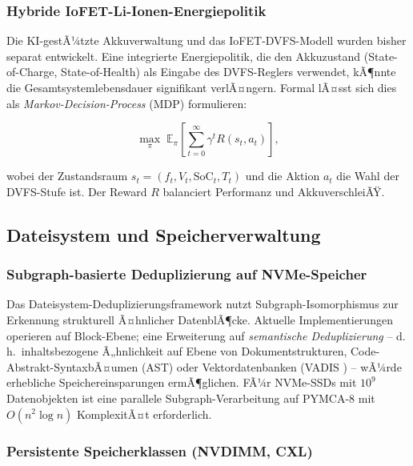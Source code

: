 ﻿\documentclass[a4paper,12pt]{scrreprt}
\theoremstyle{definition}
\begin{document}
	\subsubsection{Hybride IoFET-Li-Ionen-Energiepolitik}
	
	Die KI-gestÃ¼tzte Akkuverwaltung \cite{Epp2026liionp} und das
	IoFET-DVFS-Modell \cite{Epp2026iono} wurden bisher separat entwickelt.
	Eine integrierte Energiepolitik, die den Akkuzustand (State-of-Charge,
	State-of-Health) als Eingabe des DVFS-Reglers verwendet, kÃ¶nnte
	die Gesamtsystemlebensdauer signifikant verlÃ¤ngern. Formal lÃ¤sst sich
	dies als \emph{Markov-Decision-Process} (MDP) formulieren:
	
	\[
	\max_\pi\; \mathbb{E}_\pi\!\left[\sum_{t=0}^{\infty}
	\gamma^t R(s_t, a_t)\right],
	\]
	
	wobei der Zustandsraum $s_t = (f_t, V_t, \mathrm{SoC}_t, T_t)$
	und die Aktion $a_t$ die Wahl der DVFS-Stufe ist.
	Der Reward $R$ balanciert Performanz und AkkuverschleiÃŸ.
	
	\subsection{Dateisystem und Speicherverwaltung}
	
	\subsubsection{Subgraph-basierte Deduplizierung auf NVMe-Speicher}
	
	Das Dateisystem-Deduplizierungsframework \cite{Epp2026dusgraph} nutzt
	Subgraph-Isomorphismus zur Erkennung strukturell Ã¤hnlicher DatenblÃ¶cke.
	Aktuelle Implementierungen operieren auf Block-Ebene; eine Erweiterung
	auf \emph{semantische Deduplizierung} -- d.\,h.\ inhaltsbezogene Ã„hnlichkeit
	auf Ebene von Dokumentstrukturen, Code-Abstrakt-SyntaxbÃ¤umen (AST) oder
	Vektordatenbanken (VADIS \cite{Epp2026vadis}) -- wÃ¼rde erhebliche
	Speichereinsparungen ermÃ¶glichen. FÃ¼r NVMe-SSDs mit $10^9$ Datenobjekten
	ist eine parallele Subgraph-Verarbeitung auf PYMCA-8 mit $O(n^2\log n)$
	KomplexitÃ¤t erforderlich.
	
	\subsubsection{Persistente Speicherklassen (NVDIMM, CXL)}
	
\end{document}
